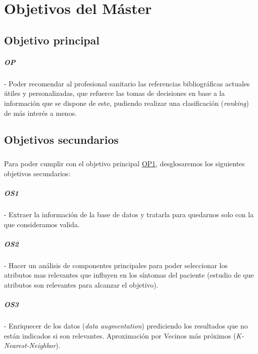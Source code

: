 \chapter{Objetivos del Máster}
\label{chapter:objetivos}


\section{Objetivo principal}

\label{op:OP1}
\paragraph{OP} - Poder recomendar al profesional sanitario las referencias bibliográficas actuales útiles y personalizadas, que refuerce las tomas de decisiones en base a la información que se dispone de este, pudiendo realizar una clasificación (\textit{ranking}) de más interés a menos.

\section{Objetivos secundarios}

\paragraph{}
Para poder cumplir con el objetivo principal \hyperref[op:OP1]{OP1}, desglosaremos los siguientes objetivos secundarios:

\label{os:OS1}
\paragraph{OS1} - Extraer la información de la base de datos y tratarla para quedarnos solo con la que consideramos valida.

\label{os:OS2}
\paragraph{OS2} - Hacer un análisis de componentes principales para poder seleccionar los atributos mas relevantes que influyen en los síntomas del paciente (estudio de que atributos son relevantes para alcanzar el objetivo).

\label{os:OS3}
\paragraph{OS3} - Enriquecer de los datos (\textit{data augmentation}) prediciendo los resultados que no están indicados si son relevantes. Aproximación por Vecinos más próximos (\textit{K-Nearest-Neighbor}).

